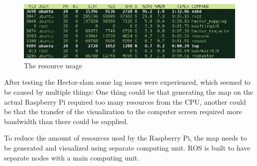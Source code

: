 \begin{figure}[H]
	\centering
	\includegraphics[width=.8\linewidth]{images/rvisScreenshotCropped.jpg}
	\caption{The resource usage}
\end{figure}


After testing the Hector-slam some lag issues were experienced, which seemed to be caused by multiple things: One thing could be that generating the map on the actual Raspberry Pi required too many resources from the CPU, another could be that the transfer of the visualization to the computer screen required more bandwidth than there could be supplied.

To reduce the amount of resources used by the Raspberry Pi, the map needs to be generated and visualized using separate computing unit. ROS is built to have separate nodes with a main computing unit.

